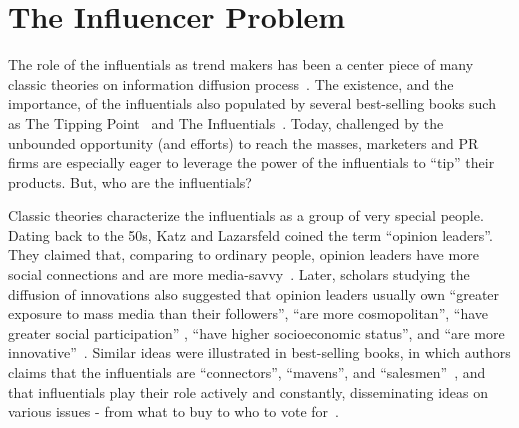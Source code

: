 \documentclass[phd,tocprelim]{cornell}
\begin{document}
\section{The Influencer Problem}



The role of the influentials as trend makers has been a center piece of many classic theories on information diffusion process~\cite{katz_lazarsfeld,rogers-2003}. The existence, and the importance, of the influentials also populated by several best-selling books such as The Tipping Point~\cite{Gladwell:2002} and The Influentials~\cite{keller_berry}. Today, challenged by the unbounded opportunity (and efforts) to reach the masses, marketers and PR firms are especially eager to leverage the power of the influentials to ``tip'' their products. But, who are the influentials? 

Classic theories characterize the influentials as a group of very special people. Dating back to the 50s, Katz and Lazarsfeld coined the term ``opinion leaders''. They claimed that, comparing to ordinary people, opinion leaders have more social connections and are more media-savvy~\cite{katz_lazarsfeld}. Later, scholars studying the diffusion of innovations also suggested that opinion leaders usually own ``greater exposure to mass media than their followers'', ``are more cosmopolitan'', ``have greater social participation'' , ``have higher socioeconomic status'', and ``are more innovative''~\cite{rogers-2003}. Similar ideas were illustrated in best-selling books, in which authors claims that the influentials are ``connectors'', ``mavens'', and ``salesmen''~\cite{Gladwell:2002}, and that influentials play their role actively and constantly, disseminating ideas on various issues - from what to buy to who to vote for~\cite{keller_berry}.
\end{document}
